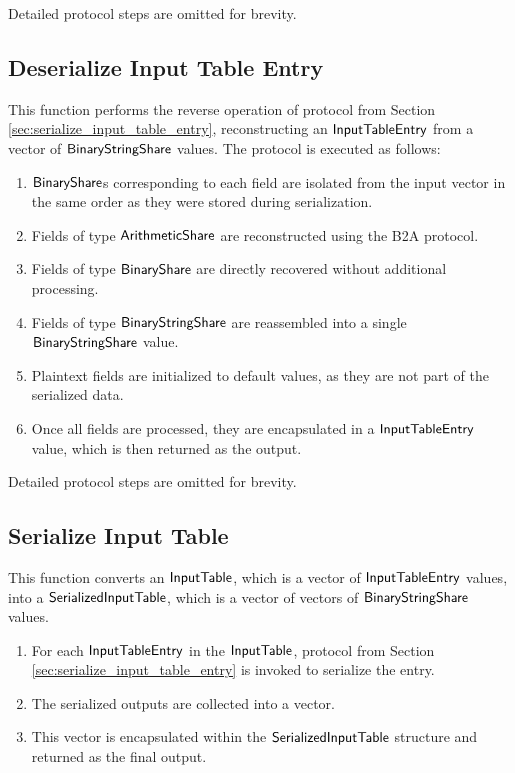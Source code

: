 Detailed protocol steps are omitted for brevity.

\subsection{Deserialize Input Table Entry} 
\label{sec:deserialize_input_table_entry}

This function performs the reverse operation of protocol from Section \ref{sec:serialize_input_table_entry}, reconstructing an ${\mathsf{InputTableEntry}}$ from a vector of ${\mathsf{BinaryStringShare}}$ values. The protocol is executed as follows:

\begin{enumerate}
    \item ${\mathsf{BinaryShare}}$s corresponding to each field are isolated from the input vector in the same order as they were stored during serialization.
    \item Fields of type ${\mathsf{ArithmeticShare}}$ are reconstructed using the B2A protocol.
    \item Fields of type ${\mathsf{BinaryShare}}$ are directly recovered without additional processing.
    \item Fields of type ${\mathsf{BinaryStringShare}}$ are reassembled into a single ${\mathsf{BinaryStringShare}}$ value.
    \item Plaintext fields are initialized to default values, as they are not part of the serialized data.
    \item Once all fields are processed, they are encapsulated in a ${\mathsf{InputTableEntry}}$ value, which is then returned as the output.
\end{enumerate}

Detailed protocol steps are omitted for brevity.

\subsection{Serialize Input Table} 
\label{sec:serialize_input_table}

This function converts an ${\mathsf{InputTable}}$, which is a vector of ${\mathsf{InputTableEntry}}$ values, into a ${\mathsf{SerializedInputTable}}$, which is a vector of vectors of ${\mathsf{BinaryStringShare}}$ values.

\begin{enumerate}
    \item For each ${\mathsf{InputTableEntry}}$ in the ${\mathsf{InputTable}}$, protocol from Section \ref{sec:serialize_input_table_entry} is invoked to serialize the entry.
    \item The serialized outputs are collected into a vector.
    \item This vector is encapsulated within the ${\mathsf{SerializedInputTable}}$ structure and returned as the final output.
\end{enumerate}

